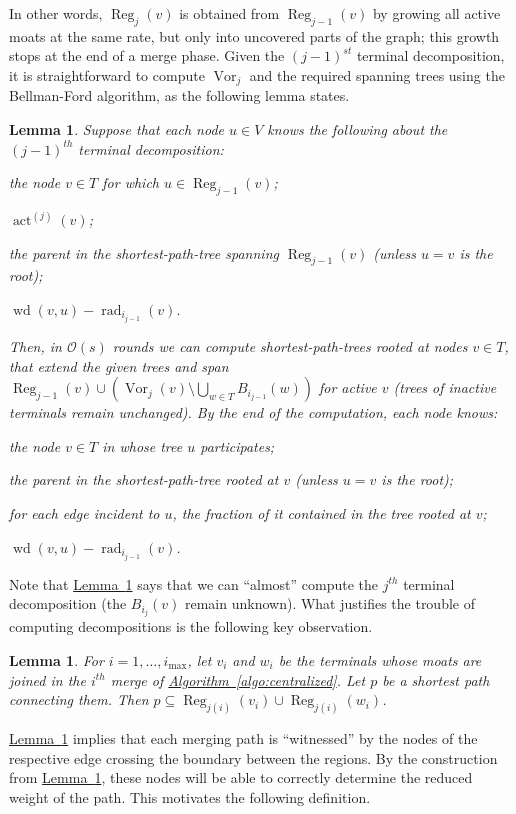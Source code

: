 \documentclass[letterpaper,11pt]{article}
\newtheorem{lemma}[theorem]{Lemma}
\newcommand{\namedref}[2]{\hyperref[#2]{#1~\ref*{#2}}}
\newcommand{\lemmaref}[1]{\namedref{Lemma}{#1}}
\newcommand{\algref}[1]{\namedref{Algorithm}{#1}}
\newcommand{\BO}{\mathcal{O}}
\DeclareMathOperator{\act}{act}
\DeclareMathOperator{\moat}{rad}
\DeclareMathOperator{\Wd}{wd}
\DeclareMathOperator{\reg}{Reg}
\DeclareMathOperator{\vor}{Vor}
\begin{document}
In other words, $\reg_j(v)$ is obtained from $\reg_{j-1}(v)$ by growing all
active moats at the same rate, but only into uncovered parts of the graph; this growth
stops at the end of a merge phase. Given the $(j-1)^{st}$ terminal
decomposition, it 
is straightforward to compute $\vor_j$ and the required spanning trees
using the Bellman-Ford algorithm, as the following lemma states.


\begin{lemma}\label{lemma:partition}
  Suppose that each node $u\in V$
knows the
  following about the $(j-1)^{th}$ terminal decomposition:
  \begin{compactitem}
  \item the node $v\in T$ for which $u\in \reg_{j-1}(v)$;
  \item $\act^{(j)}(v)$;
  \item the parent in the shortest-path-tree spanning $\reg_{j-1}(v)$  (unless
  $u=v$ is the root);
  \item $\Wd(v,u)-\moat_{i_{j-1}}(v)$.
  \end{compactitem}
  Then, in $\BO(s)$ rounds we can compute shortest-path-trees rooted
  at nodes $v\in T$, that extend the given trees and span
$\reg_{j-1}(v)\cup\left(\vor_j(v)\setminus \bigcup_{w\in
  T}B_{i_{j-1}}(w)\right)$ for active $v$ (trees of inactive terminals
remain unchanged). By the end of the computation, each node
knows: \begin{compactitem}
  \item the node $v\in T$ in whose tree $u$ participates;
  \item the parent in the shortest-path-tree rooted at $v$ (unless $u=v$
    is the root);
  \item for each edge incident to $u$, the fraction of it contained in
  the tree rooted at $v$;
  \item $\Wd(v,u)-\moat_{i_{j-1}}(v)$.
  \end{compactitem}
\end{lemma}
Note that \lemmaref{lemma:partition} says that we can ``almost'' compute
the $j^{th}$ terminal
decomposition (the $B_{i_j}(v)$ remain unknown).
What justifies the trouble of computing decompositions is the
following key observation.


\begin{lemma}\label{lemma:path_in_region}
  For $i=1,\ldots,i_{\max}$, let $v_i$ and $w_i$ be the 
  terminals whose moats are joined in the $i^{th}$ merge of
  \algref{algo:centralized}. Let $p$ be a shortest path connecting
  them. Then $p\subseteq\reg_{j(i)}(v_i)\cup
  \reg_{j(i)}(w_i)$.
\end{lemma}
\lemmaref{lemma:path_in_region} implies that each merging path is ``witnessed''
by the nodes of the respective edge crossing the boundary between the regions.
By the construction from \lemmaref{lemma:partition}, these nodes will be
able to correctly determine the reduced weight of the path. This
motivates the following 
definition.
\end{document}
